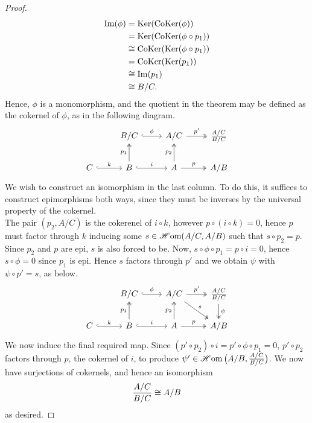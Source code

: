 \documentclass[a4paper]{article}
\begin{document}
\begin{proof}
    \begin{align*}
        \operatorname{Im}(\phi) &= \operatorname{Ker}(\operatorname{CoKer}(\phi)) \\
            &= \operatorname{Ker}(\operatorname{CoKer}(\phi \circ p_1)) \\
            &\cong \operatorname{CoKer}(\operatorname{Ker}(\phi \circ p_1)) \\
            &= \operatorname{CoKer}(\operatorname{Ker}(p_1)) \\
            &\cong \operatorname{Im}(p_1) \\
            &\cong B/C.
    \end{align*}
    Hence, $\phi$ is a monomorphism, and the quotient in the theorem may be defined as the cokernel of $\phi$, as in the following diagram.
    \[
        \begin{tikzcd}
            & B/C \arrow[r, "\phi", hook] & A/C \arrow[r, "p'", two heads] & \frac{A/C}{B/C}\\
            C \arrow[r, hook, "k"] & B \arrow[u, "p_1", two heads] \arrow[r, "i", hook] & A \arrow[u, "p_2", two heads] \arrow[r, "p", two heads] & A/B
        \end{tikzcd}
    \]
    We wish to construct an isomorphism in the last column. To do this, it suffices to construct epimorphisms both ways, since they must be inverses by the universal property of the cokernel.\\
    The pair $(p_2, A/C)$ is the cokerenel of $i\circ k$, however $p \circ (i \circ k) = 0$, hence $p$ must factor through $k$ inducing some $s\in\operatorname{\mathscr{H}om}(A/C, A/B)$ such that $s\circ p_2 = p$. Since $p_2$ and $p$ are epi, $s$ is also forced to be. Now, $s \circ \phi \circ p_1 = p \circ i = 0$, hence $s \circ \phi = 0$ since $p_1$ is epi. Hence $s$ factors through $p'$ and we obtain $\psi$ with $\psi \circ p' = s$, as below.
    \[
        \begin{tikzcd}
            & B/C \arrow[r, "\phi", hook] & A/C \arrow[r, "p'", two heads] \arrow[rd, "s", two heads] & \frac{A/C}{B/C} \arrow[d, "\psi", two heads]\\
            C \arrow[r, hook, "k"] & B \arrow[u, "p_1", two heads] \arrow[r, "i", hook] & A \arrow[u, "p_2", two heads] \arrow[r, "p", two heads] & A/B
        \end{tikzcd}
    \]
    We now induce the final required map. Since $(p' \circ p_2) \circ i = p' \circ \phi \circ p_1 = 0$, $p' \circ p_2$ factors through $p$, the cokernel of $i$, to produce $\psi' \in \operatorname{\mathscr{H}om}\big(A/B, \frac{A/C}{B/C}\big)$. We now have surjections of cokernels, and hence an isomorphism 
    \[
        \frac{A/C}{B/C} \cong A/B
    \]
    as desired.
\end{proof}
\end{document}
